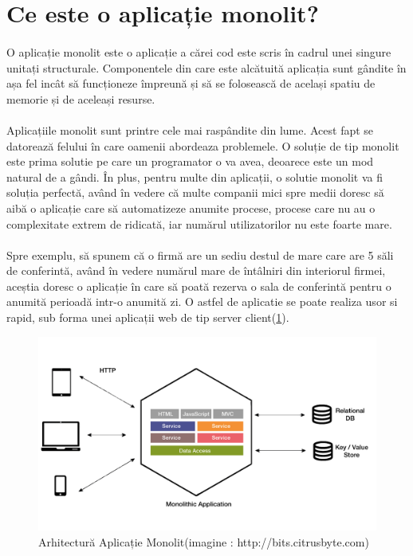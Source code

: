 \documentclass[12pt]{report}
\begin{document}
  	\section{Ce este o aplicație monolit?}
  	\paragraph{}O aplicație monolit este o aplicație a cărei cod este scris în cadrul unei singure unitați structurale. Componentele din care este alcătuită aplicația sunt gândite în așa fel incât să funcționeze împreună și să se folosească de același spatiu de memorie și de aceleași resurse.
  	\paragraph{}Aplicațiile monolit sunt printre cele mai raspândite din lume. Acest fapt se datorează felului în care oamenii abordeaza problemele. O soluție de tip monolit este prima solutie pe care un programator o va avea, deoarece este un mod natural de a gândi. În plus, pentru multe din aplicații, o solutie monolit va fi soluția perfectă, având în vedere că multe companii mici spre medii doresc să aibă o aplicație care să automatizeze anumite procese, procese care nu au o complexitate extrem de ridicată, iar numărul utilizatorilor nu este foarte mare. 
  	\paragraph{}Spre exemplu, să spunem că o firmă are un sediu destul de mare care are 5 săli de conferintă, având în vedere numărul mare de întâlniri din interiorul firmei, aceștia doresc o aplicație în care să poată rezerva o sala de conferintă pentru o anumită perioadă intr-o anumită zi. O astfel de aplicatie se poate realiza usor si rapid, sub forma unei aplicații web de tip server client(\ref{monolithicArhitecture}).
  	\begin{figure}[h]
  	\centering
  	\includegraphics[scale=.2]{monolitFigure}
	\caption{Arhitectură Aplicație Monolit(imagine : http://bits.citrusbyte.com)}  
	\label{monolithicArhitecture}
  	\end{figure}
\end{document}
